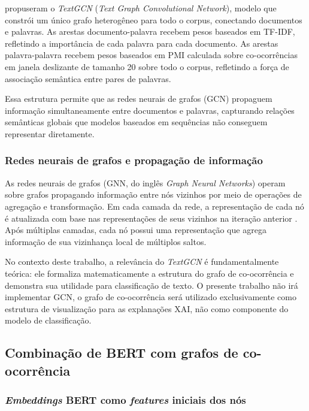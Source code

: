 \documentclass[
    12pt,                %
    openright,           %
    oneside,             %
    a4paper,             %
    english,             %
    brazil               %
]{abntex2}
\begin{document}
 propuseram o \textit{TextGCN} (\textit{Text Graph Convolutional Network}), modelo que constrói um único grafo heterogêneo para todo o corpus, conectando documentos e palavras. As arestas documento-palavra recebem pesos baseados em TF-IDF, refletindo a importância de cada palavra para cada documento. As arestas palavra-palavra recebem pesos baseados em PMI calculada sobre co-ocorrências em janela deslizante de tamanho 20 sobre todo o corpus, refletindo a força de associação semântica entre pares de palavras.

Essa estrutura permite que as redes neurais de grafos (GCN) propaguem informação simultaneamente entre documentos e palavras, capturando relações semânticas globais que modelos baseados em sequências não conseguem representar diretamente.

\subsubsection{Redes neurais de grafos e propagação de informação}
\label{subsubsec:textgcn_gcn}

As redes neurais de grafos (GNN, do inglês \textit{Graph Neural Networks}) operam sobre grafos propagando informação entre nós vizinhos por meio de operações de agregação e transformação. Em cada camada da rede, a representação de cada nó é atualizada com base nas representações de seus vizinhos na iteração anterior \cite{yao2019}. Após múltiplas camadas, cada nó possui uma representação que agrega informação de sua vizinhança local de múltiplos saltos.

No contexto deste trabalho, a relevância do \textit{TextGCN} é fundamentalmente teórica: ele formaliza matematicamente a estrutura do grafo de co-ocorrência e demonstra sua utilidade para classificação de texto. O presente trabalho não irá implementar GCN, o grafo de co-ocorrência será utilizado exclusivamente como estrutura de visualização para as explanações XAI, não como componente do modelo de classificação.

\subsection{Combinação de BERT com grafos de co-ocorrência}
\label{subsec:bert_grafo}

\subsubsection{\textit{Embeddings} BERT como \textit{features} iniciais dos nós}
\label{subsubsec:bert_grafo_embeddings}
\end{document}

